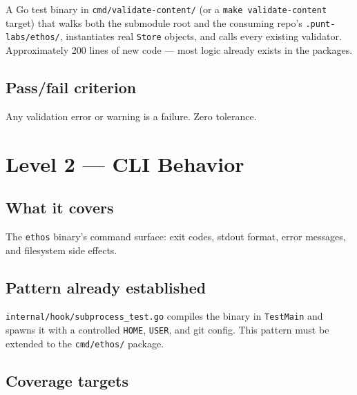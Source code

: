 \documentclass[a4paper,10pt]{article}
\newcommand{\pkg}[1]{\texttt{#1}}
\newcommand{\tool}[1]{\texttt{#1}}
\newcommand{\cmd}[1]{\texttt{#1}}
\newcommand{\fpath}[1]{\texttt{#1}}
\begin{document}
A Go test binary in \fpath{cmd/validate-content/} (or a
\cmd{make validate-content} target) that walks both the submodule root
and the consuming repo's \fpath{.punt-labs/ethos/}, instantiates real
\pkg{Store} objects, and calls every existing validator.
Approximately 200 lines of new code --- most logic already exists in
the packages.

\subsection*{Pass/fail criterion}

Any validation error or warning is a failure.  Zero tolerance.

\section{Level 2 --- CLI Behavior}

\subsection*{What it covers}

The \tool{ethos} binary's command surface: exit codes, stdout format,
error messages, and filesystem side effects.

\subsection*{Pattern already established}

\fpath{internal/hook/subprocess\_test.go} compiles the binary in
\pkg{TestMain} and spawns it with a controlled \texttt{HOME},
\texttt{USER}, and git config.  This pattern must be extended to the
\fpath{cmd/ethos/} package.

\subsection*{Coverage targets}
\end{document}
